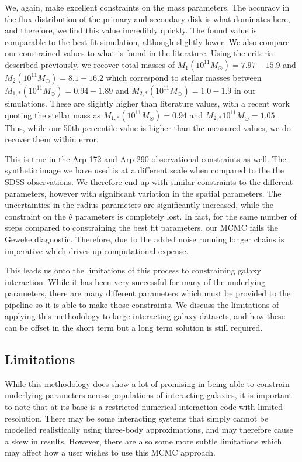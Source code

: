 We, again, make excellent constraints on the mass parameters. The accuracy in the flux distribution of the primary and secondary disk is what dominates here, and therefore, we find this value incredibly quickly. The found value is comparable to the best fit simulation, although slightly lower. We also compare our constrained values to what is found in the literature. Using the criteria described previously, we recover total masses of $M_{1} (10^{11}M_{\odot}) = 7.97 - 15.9$ and $M_{2} (10^{11}M_{\odot}) = 8.1 - 16.2$ which correspond to stellar masses between $M_{1,*}(10^{11}M_{\odot}) =  0.94 - 1.89$ and $M_{2, *} (10^{11}M_{\odot}) = 1.0 - 1.9$ in our simulations. These are slightly higher than literature values, with a recent work quoting the stellar mass as $M_{1, *}(10^{11}M_{\odot}) = 0.94 $ and $M_{2, *}10^{11}M_{\odot} = 1.05$ \citep{2020MNRAS.496.5243H}. Thus, while our 50th percentile value is higher than the measured values, we do recover them within error.

This is true in the Arp 172 and Arp 290 observational constraints as well. The synthetic image we have used is at a different scale when compared to the the SDSS observations. We therefore end up with similar constraints to the different parameters, however with significant variation in the spatial parameters. The uncertainties in the radius parameters are significantly increased, while the constraint on the $\theta$ parameters is completely lost. In fact, for the same number of steps compared to constraining the best fit parameters, our MCMC fails the Geweke diagnostic. Therefore, due to the added noise running longer chains is imperative which drives up computational expense.

This leads us onto the limitations of this process to constraining galaxy interaction. While it has been very successful for many of the underlying parameters, there are many different parameters which must be provided to the pipeline so it is able to make those constraints. We discuss the limitations of applying this methodology to large interacting galaxy datasets, and how these can be offset in the short term but a long term solution is still required.

\subsection{Limitations}\label{limitations}
\noindent While this methodology does show a lot of promising in being able to constrain underlying parameters across populations of interacting galaxies, it is important to note that at its base is a restricted numerical interaction code with limited resolution. There may be some interacting systems that simply cannot be modelled realistically using three-body approximations, and may therefore cause a skew in results. However, there are also some more subtle limitations which may affect how a user wishes to use this MCMC approach.

